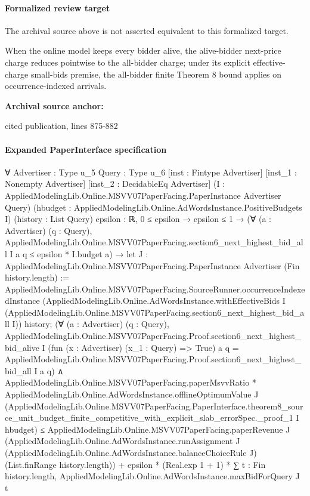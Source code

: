 \documentclass[10pt]{article}
\begin{document}
\paragraph{Formalized review target}
The archival source above is not asserted equivalent to this formalized target.
\begin{ReviewVerbatim}
When the online model keeps every bidder alive, the alive-bidder next-price charge reduces pointwise to the all-bidder charge; under its explicit effective-charge small-bids premise, the all-bidder finite Theorem 8 bound applies on occurrence-indexed arrivals.
\end{ReviewVerbatim}

\textbf{Archival source anchor:} {\footnotesize\raggedright cited publication, lines 875-\allowbreak{}882\par}
\paragraph{Expanded PaperInterface specification}
\begin{ReviewVerbatim}
∀ {Advertiser : Type u_5} {Query : Type u_6} [inst : Fintype Advertiser] [inst_1 : Nonempty Advertiser]
  [inst_2 : DecidableEq Advertiser] (I : AppliedModelingLib.Online.MSVV07PaperFacing.PaperInstance Advertiser Query)
  (hbudget : AppliedModelingLib.Online.AdWordsInstance.PositiveBudgets I) (history : List Query) {epsilon : ℝ},
  0 ≤ epsilon →
    epsilon ≤ 1 →
      (∀ (a : Advertiser) (q : Query),
          AppliedModelingLib.Online.MSVV07PaperFacing.section6_next_highest_bid_all I a q ≤ epsilon * I.budget a) →
        let J : AppliedModelingLib.Online.MSVV07PaperFacing.PaperInstance Advertiser (Fin history.length) :=
          AppliedModelingLib.Online.MSVV07PaperFacing.SourceRunner.occurrenceIndexedInstance
            (AppliedModelingLib.Online.AdWordsInstance.withEffectiveBids I
              (AppliedModelingLib.Online.MSVV07PaperFacing.section6_next_highest_bid_all I))
            history;
        (∀ (a : Advertiser) (q : Query),
            AppliedModelingLib.Online.MSVV07PaperFacing.Proof.section6_next_highest_bid_alive I
                (fun (x : Advertiser) (x_1 : Query) => True) a q =
              AppliedModelingLib.Online.MSVV07PaperFacing.Proof.section6_next_highest_bid_all I a q) ∧
          AppliedModelingLib.Online.MSVV07PaperFacing.paperMsvvRatio *
              AppliedModelingLib.Online.AdWordsInstance.offlineOptimumValue J
                (AppliedModelingLib.Online.MSVV07PaperFacing.PaperInterface.theorem8_source_unit_budget_finite_competitive_with_explicit_slab_errorSpec._proof_1
                  I hbudget) ≤
            AppliedModelingLib.Online.MSVV07PaperFacing.paperRevenue J
                (AppliedModelingLib.Online.AdWordsInstance.runAssignment J
                  (AppliedModelingLib.Online.AdWordsInstance.balanceChoiceRule J) (List.finRange history.length)) +
              epsilon * (Real.exp 1 + 1) *
                ∑ t : Fin history.length, AppliedModelingLib.Online.AdWordsInstance.maxBidForQuery J t
\end{ReviewVerbatim}
\end{document}
